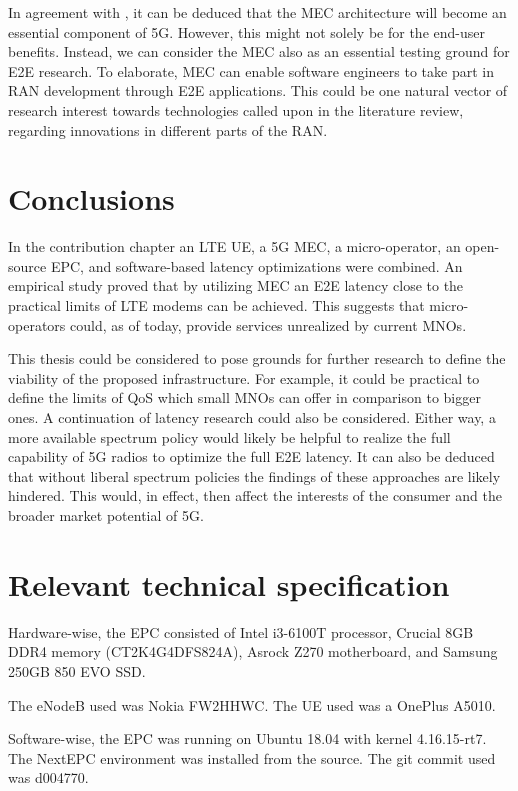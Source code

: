 \documentclass[12pt]{article}
\begin{document}
In agreement with \cite{saguna-intel2016}, it can be deduced that the \gls{MEC} architecture will become an essential component of \gls{5G}. However, this might not solely be for the end-user benefits. Instead, we can consider the \gls{MEC} also as an essential testing ground for \gls{E2E} research. To elaborate, \gls{MEC} can enable software engineers to take part in \gls{RAN} development through \gls{E2E} applications. This could be one natural vector of research interest towards technologies called upon in the literature review, regarding innovations in different parts of the \gls{RAN}.

\newpage

\section{Conclusions}

In the contribution chapter an \gls{LTE} \gls{UE}, a \gls{5G} \gls{MEC}, a micro-operator, an open-source \gls{EPC}, and software-based latency optimizations were combined. An empirical study proved that by utilizing \gls{MEC} an \gls{E2E} latency close to the practical limits of \gls{LTE} modems can be achieved. This suggests that micro-operators could, as of today, provide services unrealized by current \glspl{MNO}.

This thesis could be considered to pose grounds for further research to define the viability of the proposed infrastructure. For example, it could be practical to define the limits of \gls{QoS} which small \glspl{MNO} can offer in comparison to bigger ones. A continuation of latency research could also be considered. Either way, a more available spectrum policy would likely be helpful to realize the full capability of \gls{5G} radios to optimize the full \gls{E2E} latency. It can also be deduced that without liberal spectrum policies the findings of these approaches are likely hindered. This would, in effect, then affect the interests of the consumer and the broader market potential of \gls{5G}.

\newpage
\appendix
\newpage

\section{Relevant technical specification}
\label{ch:hardware}

Hardware-wise, the EPC consisted of Intel i3-6100T processor, Crucial 8GB DDR4 memory (CT2K4G4DFS824A), Asrock Z270 motherboard, and Samsung 250GB 850 EVO SSD.

The eNodeB used was Nokia FW2HHWC. The \gls{UE} used was a OnePlus A5010.

Software-wise, the EPC was running on Ubuntu 18.04 with kernel 4.16.15-rt7. The NextEPC environment was installed from the source. The git commit used was d004770.

\newpage


\end{document}
